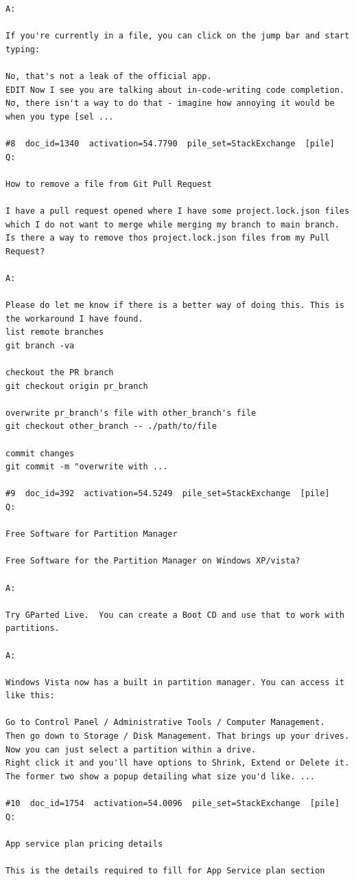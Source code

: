 \begin{verbatim}
A:

If you're currently in a file, you can click on the jump bar and start typing:

No, that's not a leak of the official app.
EDIT Now I see you are talking about in-code-writing code completion. No, there isn't a way to do that - imagine how annoying it would be when you type [sel ...

#8  doc_id=1340  activation=54.7790  pile_set=StackExchange  [pile]
Q:

How to remove a file from Git Pull Request

I have a pull request opened where I have some project.lock.json files which I do not want to merge while merging my branch to main branch. Is there a way to remove thos project.lock.json files from my Pull Request?

A:

Please do let me know if there is a better way of doing this. This is the workaround I have found.
list remote branches
git branch -va

checkout the PR branch
git checkout origin pr_branch

overwrite pr_branch's file with other_branch's file
git checkout other_branch -- ./path/to/file

commit changes
git commit -m "overwrite with ...

#9  doc_id=392  activation=54.5249  pile_set=StackExchange  [pile]
Q:

Free Software for Partition Manager

Free Software for the Partition Manager on Windows XP/vista?  

A:

Try GParted Live.  You can create a Boot CD and use that to work with partitions.

A:

Windows Vista now has a built in partition manager. You can access it like this:

Go to Control Panel / Administrative Tools / Computer Management. 
Then go down to Storage / Disk Management. That brings up your drives. 
Now you can just select a partition within a drive.
Right click it and you'll have options to Shrink, Extend or Delete it. The former two show a popup detailing what size you'd like. ...

#10  doc_id=1754  activation=54.0096  pile_set=StackExchange  [pile]
Q:

App service plan pricing details

This is the details required to fill for App Service plan section


\end{verbatim}
